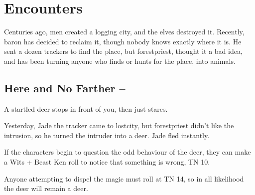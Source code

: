 %
%
%
%
%

\setcounter{encnum}{1}
\section{Encounters}
Centuries ago, men created a logging city, and the elves destroyed it.  Recently, \gls{baron} has decided to reclaim it, though nobody knows exactly where it is.  He sent a dozen trackers to find the place, but \gls{forestpriest}, thought it a bad idea, and has been turning anyone who finds or hunts for the place, into animals.

\subsection[Here and No Farther]{Here and No Farther -- \encnum}\label{herenofarther}

\begin{boxtext}

	A startled deer stops in front of you, then just stares.

\end{boxtext}

Yesterday, Jade the tracker came to \gls{lostcity}, but \gls{forestpriest} didn't like the intrusion, so he turned the intruder into a deer.  Jade fled instantly.

If the characters begin to question the odd behaviour of the deer, they can make a Wits + Beast Ken roll to notice that something is wrong, TN 10.

Anyone attempting to dispel the magic must roll at TN 14, so in all likelihood the deer will remain a deer.


